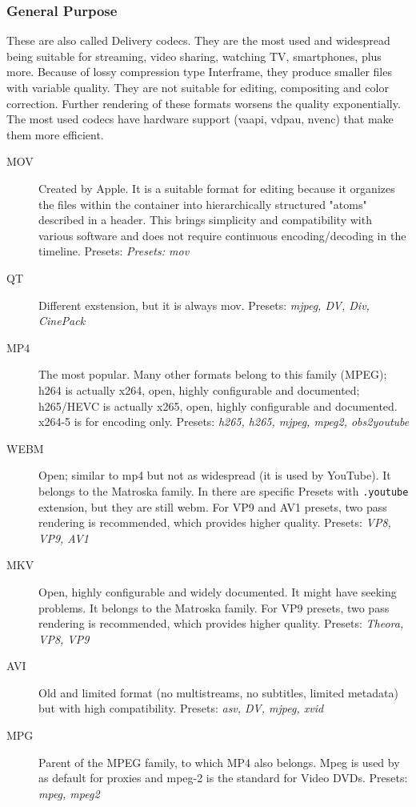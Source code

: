 \subsubsection{General Purpose}
\label{ssub:ffmpeg_video_general_purpose}

These are also called Delivery codecs. They are the most used and widespread being suitable for streaming, video sharing, watching TV, smartphones, plus more. Because of lossy compression type Interframe, they produce smaller files with variable quality. They are not suitable for editing, compositing and color correction. Further rendering of these formats worsens the quality exponentially. The most used codecs have hardware support (vaapi, vdpau, nvenc) that make them more efficient.

\begin{description}
	\item[MOV] Created by Apple. It is a suitable format for editing because it organizes the files within the container into hierarchically structured "atoms" described in a header. This brings simplicity and compatibility with various software and does not require continuous encoding/decoding in the timeline.
	\newline Presets: \textit{Presets: mov}
	\item[QT] Different exstension, but it is always mov.
	\newline Presets: \textit{mjpeg, DV, Div, CinePack}
	\item[MP4] The most popular. Many other formats belong to this family (MPEG);
	\newline    h264 is actually x264, open, highly configurable and documented; h265/HEVC is actually x265, open, highly configurable and documented. x264-5 is for encoding only.
	\newline Presets: \textit{h265, h265, mjpeg, mpeg2, obs2youtube}
	\item[WEBM] Open; similar to mp4 but not as widespread (it is used by YouTube). It belongs to the Matroska family. In \CGG{} there are specific Presets with \texttt{.youtube} extension, but they are still webm. For VP9 and AV1 presets, two pass rendering is recommended, which provides higher quality.
	\newline Presets:  \textit{VP8, VP9, AV1}
	\item[MKV] Open, highly configurable and widely documented. It might have seeking problems. It belongs to the Matroska family. For VP9 presets, two pass rendering is recommended, which provides higher quality.
	\newline Presets:  \textit{Theora, VP8, VP9}
	\item[AVI] Old and limited format (no multistreams, no subtitles, limited metadata) but with high compatibility.
	\newline Presets:  \textit{asv, DV, mjpeg, xvid}
	\item[MPG] Parent of the MPEG family, to which MP4 also belongs. Mpeg is used by \CGG{} as default for proxies and mpeg-2 is the standard for Video DVDs.
	\newline Presets:  \textit{mpeg, mpeg2}
\end{description}


